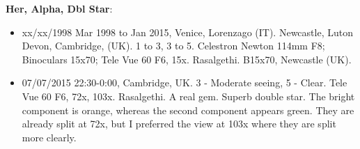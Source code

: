 {\bf Her, Alpha, Dbl Star}:
\begin{itemize}
\item xx/xx/1998 Mar 1998 to Jan 2015, Venice, Lorenzago (IT). Newcastle, Luton Devon, Cambridge, (UK). 1 to 3, 3 to 5. Celestron Newton 114mm F8; Binoculars 15x70; Tele Vue 60 F6, 15x. Rasalgethi. B15x70, Newcastle (UK).
\item 07/07/2015 22:30-0:00, Cambridge, UK. 3 - Moderate seeing, 5 - Clear. Tele Vue 60 F6, 72x, 103x. Rasalgethi. A real gem. Superb double star. The bright component is orange, whereas the second component appears green. They are already split at 72x, but I preferred the view at 103x where they are split more clearly.
\end{itemize}
